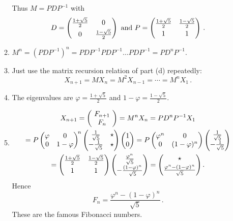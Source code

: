\begin{enumerate}
\begin{enumerate}
Thus $M=PDP^{-1}$ with \[D=\begin{pmatrix}\frac{1+\sqrt{5}}{2}&\mc0\\[1mm]\mc0&\frac{1-\sqrt{5}}{2}\end{pmatrix} \mbox{ and } P =\begin{pmatrix}\frac{1+\sqrt{5}}{2}&\frac{1-\sqrt{5}}{2}\\[1mm]\mc1&\mc1\end{pmatrix}\, .\]
\item $M^n=(P D P^{-1})^n = P D P^{-1} P D P^{-1} \ldots P D P^{-1} = P D^n P^{-1}$.
\item Just use the matrix recursion relation of part (d) repeatedly: \[X_{n+1}= M X_{n} = M^2 X_{n-1}=\cdots = M^{n} X_1\, .\]
\item The eigenvalues are $\varphi = \frac{1+\sqrt{5}}{2}$ and $1-\varphi = \frac{1-\sqrt{5}}{2}$.
\item \begin{gather*}X_{n+1}=\ccolvec{F_{n+1}\\F_n}=
M^n X_n = P D^n P^{-1} X_{1}\\=P 
\begin{pmatrix}\varphi&\mc0\\\mc0&1-\varphi\end{pmatrix}^{\!n} 
\begin{pmatrix}\frac{1}{\sqrt{5}}&\star \\-\frac{1}{\sqrt{5}}& \star\end{pmatrix}
\begin{pmatrix}1\\ 0\end{pmatrix}
=P 
\begin{pmatrix}\varphi^n&\mc0\\\mc0&(1-\varphi)^n\end{pmatrix}
\begin{pmatrix}\frac{1}{\sqrt{5}}\\-\frac{1}{\sqrt{5}}\end{pmatrix}
\\
=\begin{pmatrix}\frac{1+\sqrt{5}}{2}&\frac{1-\sqrt{5}}{2}\\[1mm]\mc1&\mc1\end{pmatrix}
\begin{pmatrix}\mc{\frac{\varphi^n}{\sqrt{5}}}\\[1mm]-\frac{(1-\varphi)^n}{\sqrt{5}}\end{pmatrix}
=\begin{pmatrix}\mc\star \\[1mm]\frac{\varphi^n-(1-\varphi)^n}{\sqrt{5}}\end{pmatrix}.
\end{gather*}
Hence
\[F_n=\frac{\varphi^n-(1-\varphi)^n}{\sqrt{5}}\, .\]
These are the famous Fibonacci numbers.
\end{enumerate}



\end{enumerate}
